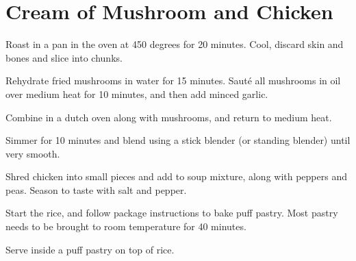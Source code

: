 
\section{Cream of Mushroom and Chicken}
\begin{recipe}



Roast in a pan in the oven at 450 degrees for 20 minutes. Cool, discard skin and bones and slice into chunks.


Rehydrate fried mushrooms in water for 15 minutes.
Sauté all mushrooms in oil over medium heat for 10 minutes, and then add minced garlic.


Combine in a dutch oven along with mushrooms, and return to medium heat.

Simmer for 10 minutes and blend using a stick blender (or standing blender) until very smooth.


Shred chicken into small pieces and add to soup mixture, along with peppers and peas. Season to taste with salt and pepper.


Start the rice, and follow package instructions to bake puff pastry. Most pastry needs to be brought to room temperature for 40 minutes.

Serve inside a puff pastry on top of rice.

\end{recipe}
